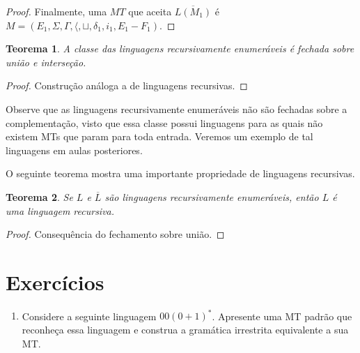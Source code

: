\documentclass[a4paper]{article}
\newtheorem{Theorem}{Teorema}
\theoremstyle{definition}
\begin{document}
\begin{proof}
         Finalmente, uma $MT$ que aceita $\overline{L(M_1)}$ é
         $M=(E_1,\Sigma, \Gamma, \langle, \sqcup, \delta_1, i_1,E_1 - F_1)$.
       \end{proof}

       \begin{Theorem}
         A classe das linguagens recursivamente enumeráveis é fechada sobre
         união e interseção.
       \end{Theorem}
       \begin{proof}
         Construção análoga a de linguagens recursivas.
       \end{proof}

       Observe que as linguagens recursivamente enumeráveis não são fechadas
       sobre a complementação, visto que essa classe possui linguagens para as
       quais não existem MTs que param para toda entrada. Veremos um exemplo de
       tal linguagens em aulas posteriores.

       O seguinte teorema mostra uma importante propriedade de linguagens
       recursivas.

       \begin{Theorem}
         Se $L$ e $\overline{L}$ são linguagens recursivamente enumeráveis,
         então $L$ é uma linguagem recursiva.
       \end{Theorem}
       \begin{proof}
         Consequência do fechamento sobre união.
       \end{proof}
       
  \section{Exercícios}

  \begin{enumerate}
     \item Considere a seguinte linguagem $00(0 + 1)^*$. Apresente uma MT padrão
       que reconheça essa linguagem e construa a gramática irrestrita
       equivalente a sua MT.
  \end{enumerate}
\end{document}
